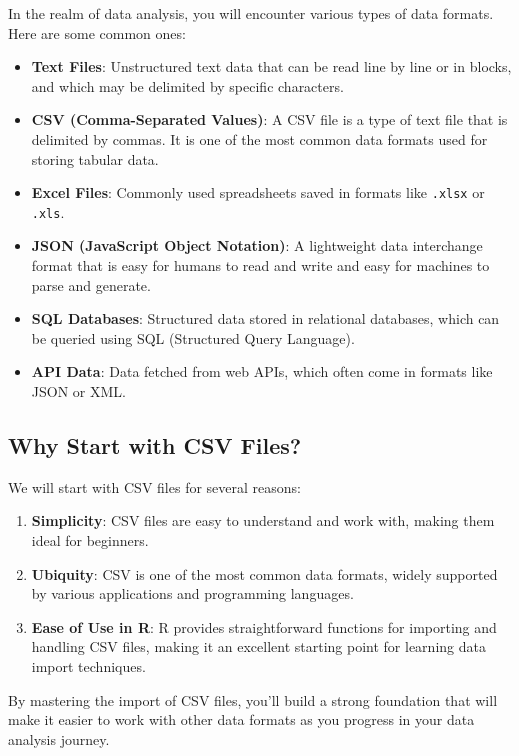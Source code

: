 \documentclass[
]{book}
\providecommand{\tightlist}{%
  \setlength{\itemsep}{0pt}\setlength{\parskip}{0pt}}
\begin{document}
In the realm of data analysis, you will encounter various types of data formats. Here are some common ones:

\begin{itemize}
\tightlist
\item
  \textbf{Text Files}: Unstructured text data that can be read line by line or in blocks, and which may be delimited by specific characters.
\item
  \textbf{CSV (Comma-Separated Values)}: A CSV file is a type of text file that is delimited by commas. It is one of the most common data formats used for storing tabular data.
\item
  \textbf{Excel Files}: Commonly used spreadsheets saved in formats like \texttt{.xlsx} or \texttt{.xls}.
\item
  \textbf{JSON (JavaScript Object Notation)}: A lightweight data interchange format that is easy for humans to read and write and easy for machines to parse and generate.
\item
  \textbf{SQL Databases}: Structured data stored in relational databases, which can be queried using SQL (Structured Query Language).
\item
  \textbf{API Data}: Data fetched from web APIs, which often come in formats like JSON or XML.
\end{itemize}

\subsection{Why Start with CSV Files?}\label{why-start-with-csv-files}

We will start with CSV files for several reasons:

\begin{enumerate}
\def\labelenumi{\arabic{enumi}.}
\tightlist
\item
  \textbf{Simplicity}: CSV files are easy to understand and work with, making them ideal for beginners.
\item
  \textbf{Ubiquity}: CSV is one of the most common data formats, widely supported by various applications and programming languages.
\item
  \textbf{Ease of Use in R}: R provides straightforward functions for importing and handling CSV files, making it an excellent starting point for learning data import techniques.
\end{enumerate}

By mastering the import of CSV files, you'll build a strong foundation that will make it easier to work with other data formats as you progress in your data analysis journey.
\end{document}
